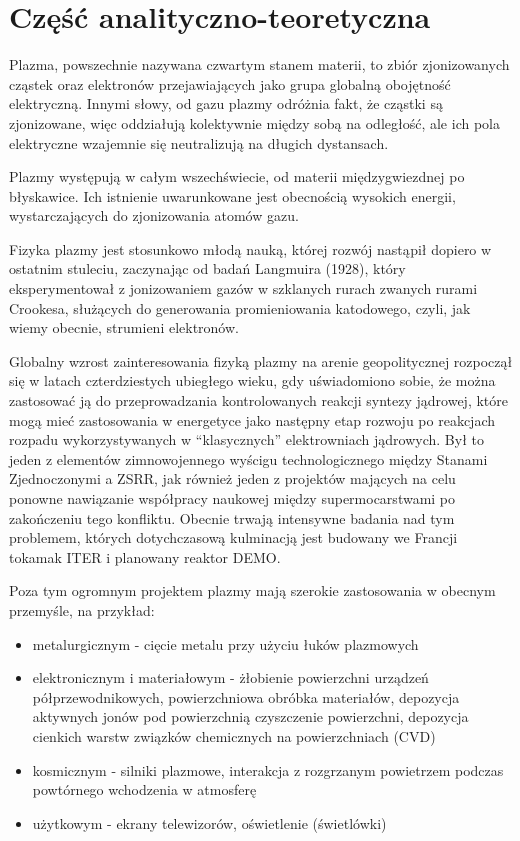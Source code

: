 \section[Część analityczno-teoretyczna]{Część analityczno-teoretyczna} %
    Plazma, powszechnie nazywana czwartym stanem materii, to zbiór
    zjonizowanych cząstek oraz elektronów przejawiających jako grupa globalną
    obojętność elektryczną. Innymi słowy, od gazu plazmy odróżnia fakt, że
    cząstki są zjonizowane, więc oddziałują kolektywnie między sobą na
    odległość, ale ich pola elektryczne wzajemnie się neutralizują na długich
    dystansach.

    Plazmy występują w całym wszechświecie, od materii międzygwiezdnej po
    błyskawice.  Ich istnienie uwarunkowane jest obecnością wysokich energii,
    wystarczających do zjonizowania atomów gazu.

    Fizyka plazmy jest stosunkowo młodą nauką, której rozwój nastąpił dopiero w
    ostatnim stuleciu, zaczynając od badań Langmuira (1928), który
    eksperymentował z jonizowaniem gazów w szklanych rurach zwanych rurami
    Crookesa, służących do generowania promieniowania katodowego, czyli, jak
    wiemy obecnie, strumieni elektronów.

    Globalny wzrost zainteresowania fizyką plazmy na arenie geopolitycznej
    rozpoczął się w latach czterdziestych ubiegłego wieku, gdy uświadomiono sobie,
    że można zastosować ją do przeprowadzania kontrolowanych reakcji syntezy
    jądrowej,
    które mogą mieć zastosowania w energetyce jako następny etap rozwoju po
    reakcjach rozpadu wykorzystywanych w ``klasycznych'' elektrowniach jądrowych.
    Był to jeden z elementów zimnowojennego wyścigu technologicznego między Stanami
    Zjednoczonymi a ZSRR, jak również jeden z projektów mających na celu ponowne
    nawiązanie współpracy naukowej między supermocarstwami po zakończeniu tego
    konfliktu. Obecnie trwają intensywne badania nad tym problemem, których
    dotychczasową kulminacją jest budowany we Francji tokamak ITER i planowany reaktor DEMO.

    Poza tym ogromnym projektem plazmy mają szerokie zastosowania w obecnym
    przemyśle, na przykład:
    \begin{itemize}
        \item metalurgicznym - cięcie metalu przy użyciu łuków plazmowych
        \item elektronicznym i materiałowym - żłobienie powierzchni urządzeń
            półprzewodnikowych, powierzchniowa obróbka materiałów, depozycja
            aktywnych jonów pod powierzchnią czyszczenie powierzchni, depozycja
            cienkich warstw związków chemicznych na powierzchniach (CVD)
        \item kosmicznym - silniki plazmowe, interakcja z rozgrzanym powietrzem
            podczas powtórnego wchodzenia w atmosferę
        \item użytkowym - ekrany telewizorów, oświetlenie (świetlówki)
    \end{itemize}

